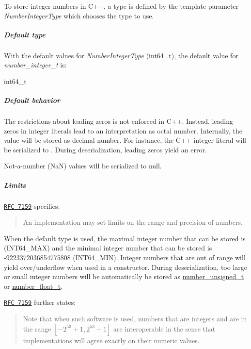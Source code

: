 To store integer numbers in C++, a type is defined by the template parameter {\itshape Number\+Integer\+Type} which chooses the type to use.

\subparagraph*{Default type}

With the default values for {\itshape Number\+Integer\+Type} ({\ttfamily int64\+\_\+t}), the default value for {\itshape number\+\_\+integer\+\_\+t} is\+:


\begin{DoxyCode}
int64\_t
\end{DoxyCode}


\subparagraph*{Default behavior}


\begin{DoxyItemize}
\item The restrictions about leading zeros is not enforced in C++. Instead, leading zeros in integer literals lead to an interpretation as octal number. Internally, the value will be stored as decimal number. For instance, the C++ integer literal {} will be serialized to {}. During deserialization, leading zeros yield an error.
\item Not-\/a-\/number (NaN) values will be serialized to {\ttfamily null}.
\end{DoxyItemize}

\subparagraph*{Limits}

\href{http://rfc7159.net/rfc7159}{\tt R\+FC 7159} specifies\+: \begin{quote}
An implementation may set limits on the range and precision of numbers. \end{quote}


When the default type is used, the maximal integer number that can be stored is {} (I\+N\+T64\+\_\+\+M\+AX) and the minimal integer number that can be stored is {\ttfamily -\/9223372036854775808} (I\+N\+T64\+\_\+\+M\+IN). Integer numbers that are out of range will yield over/underflow when used in a constructor. During deserialization, too large or small integer numbers will be automatically be stored as \hyperlink{classnlohmann_1_1basic__json_ae09af9c23351b7245d9be4d1b2035fef}{number\+\_\+unsigned\+\_\+t} or \hyperlink{classnlohmann_1_1basic__json_a5b8abaebd922d82d69756327c0c347e6}{number\+\_\+float\+\_\+t}.

\href{http://rfc7159.net/rfc7159}{\tt R\+FC 7159} further states\+: \begin{quote}
Note that when such software is used, numbers that are integers and are in the range $[-2^{53}+1, 2^{53}-1]$ are interoperable in the sense that implementations will agree exactly on their numeric values. \end{quote}


